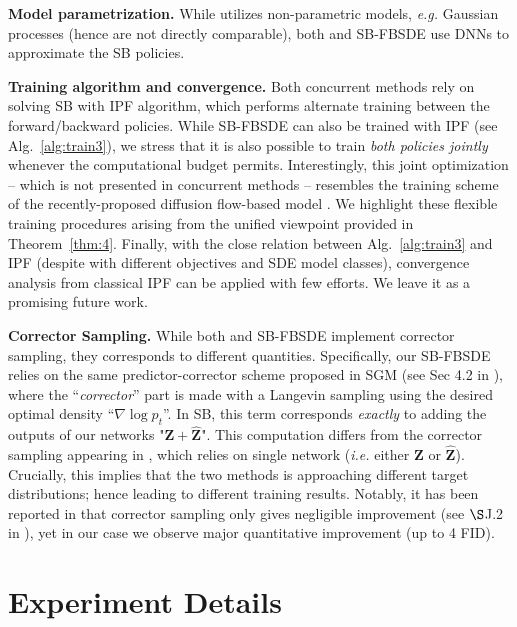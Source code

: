 \documentclass{article}
\newcommand{\eg}{{\ignorespaces\emph{e.g.}}{ }}
\newcommand{\ie}{{\ignorespaces\emph{i.e.}}{ }}
\begin{document}
\textbf{Model parametrization.}
    While \citet{vargas2021solving} utilizes non-parametric models, \eg Gaussian processes (hence are not directly comparable), both \citet{de2021diffusion} and SB-FBSDE use DNNs to approximate the SB policies.




\textbf{Training algorithm and convergence.}
    Both concurrent methods rely on solving SB with IPF algorithm,
    which performs alternate training between the forward/backward policies.
    While SB-FBSDE can also be trained with IPF (see Alg.~\ref{alg:train3}),
    we stress that it is also possible to train \textit{both policies jointly}
    whenever the computational budget permits.
    Interestingly, this joint optimization -- which is not presented in concurrent methods -- resembles the training scheme of the recently-proposed diffusion flow-based model \citep{zhang2021diffusion}.
    We highlight these flexible training procedures arising from the unified viewpoint provided in Theorem~\ref{thm:4}.
    Finally, with the close relation between Alg.~\ref{alg:train3} and IPF
    (despite with different objectives and SDE model classes),
    convergence analysis from classical IPF can be applied with few efforts. We leave it as a promising future work.

\textbf{Corrector Sampling.}
    While both \citet{de2021diffusion} and SB-FBSDE implement corrector sampling, they corresponds to different quantities. Specifically, our SB-FBSDE relies on the same predictor-corrector scheme proposed in SGM (see Sec 4.2 in \citet{song2020score}), where the ``\emph{corrector}'' part is made with a Langevin sampling using the desired optimal density ``$\nabla \log p_t$''. In SB, this term corresponds \emph{exactly} to adding the outputs of our networks "$\mathbf{Z}+\widehat{\mathbf{Z}}$". This computation differs from the corrector sampling appearing in \citet{de2021diffusion}, which relies on single network (\ie either $\mathbf{Z}$ or $\widehat{\mathbf{Z}}$). Crucially, this implies that the two methods is approaching different target distributions; hence leading to different training results. Notably, it has been reported in \citet{de2021diffusion} that corrector sampling only gives negligible improvement (see $\S$J.2 in \citet{de2021diffusion}), yet in our case we observe major quantitative improvement (up to 4 FID).




\section{Experiment Details}
\label{Appendix:Exp_detals}
\end{document}
